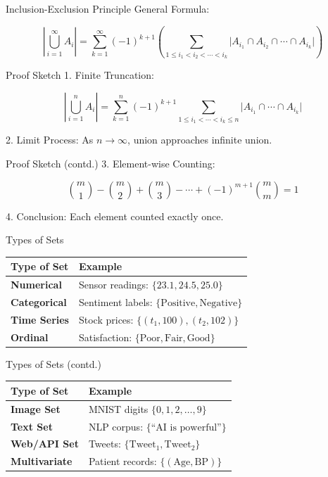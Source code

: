 \documentclass{beamer}
\begin{document}
\begin{frame}{Inclusion-Exclusion Principle}
General Formula:


\[
\left| \bigcup_{i=1}^{\infty} A_i \right|
= \sum_{k=1}^{\infty} (-1)^{k+1} 
\left( \sum_{1 \leq i_1 < i_2 < \cdots < i_k} 
\big| A_{i_1} \cap A_{i_2} \cap \cdots \cap A_{i_k} \big| \right)
\]


\end{frame}

\begin{frame}{Proof Sketch}
1. Finite Truncation:


\[
\left| \bigcup_{i=1}^{n} A_i \right|
= \sum_{k=1}^{n} (-1)^{k+1} 
\sum_{1 \leq i_1 < \cdots < i_k \leq n} 
\big| A_{i_1} \cap \cdots \cap A_{i_k} \big|
\]



2. Limit Process: As $n \to \infty$, union approaches infinite union.
\end{frame}

\begin{frame}{Proof Sketch (contd.)}
3. Element-wise Counting:


\[
\binom{m}{1} - \binom{m}{2} + \binom{m}{3} - \cdots + (-1)^{m+1}\binom{m}{m} = 1
\]



4. Conclusion: Each element counted exactly once.
\end{frame}

\begin{frame}{Types of Sets}
\begin{tabular}{|>{\bfseries}m{4cm}|m{6cm}|}
\hline
Type of Set & Example \\
\hline
Numerical & Sensor readings: $\{23.1, 24.5, 25.0\}$ \\
Categorical & Sentiment labels: $\{\text{Positive}, \text{Negative}\}$ \\
Time Series & Stock prices: $\{(t_1,100), (t_2,102)\}$ \\
Ordinal & Satisfaction: $\{\text{Poor}, \text{Fair}, \text{Good}\}$ \\
\hline
\end{tabular}
\end{frame}

\begin{frame}{Types of Sets (contd.)}
\begin{tabular}{|>{\bfseries}m{4cm}|m{6cm}|}
\hline
Type of Set & Example \\
\hline
Image Set & MNIST digits $\{0,1,2,\dots,9\}$ \\
Text Set & NLP corpus: $\{\text{``AI is powerful''}\}$ \\
Web/API Set & Tweets: $\{\text{Tweet}_1, \text{Tweet}_2\}$ \\
Multivariate & Patient records: $\{(\text{Age}, \text{BP})\}$ \\
\hline
\end{tabular}
\end{frame}
\end{document}
